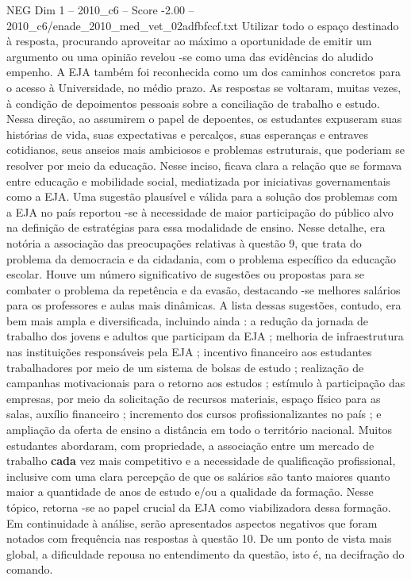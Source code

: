 \begin{textsample}{NEG Dim 1 – 2010\_c6 – Score -2.00 – 2010\_c6/enade\_2010\_med\_vet\_02adfbfccf.txt}
Utilizar todo o espaço destinado à resposta, procurando aproveitar ao máximo a oportunidade de emitir um argumento ou uma opinião revelou -se como uma das evidências do aludido empenho.
A EJA também foi reconhecida como um dos caminhos concretos para o acesso à Universidade, no médio prazo.
As respostas se voltaram, muitas vezes, à condição de depoimentos pessoais sobre a conciliação de trabalho e estudo.
Nessa direção, ao assumirem o papel de depoentes, os estudantes expuseram suas histórias de vida, suas expectativas e percalços, suas esperanças e entraves cotidianos, seus anseios mais ambiciosos e problemas estruturais, que poderiam se resolver por meio da educação.
Nesse inciso, ficava clara a relação que se formava entre educação e mobilidade social, mediatizada por iniciativas governamentais como a EJA.
Uma sugestão plausível e válida para a solução dos problemas com a EJA no país reportou -se à necessidade de maior participação do público alvo na definição de estratégias para essa modalidade de ensino.
Nesse detalhe, era notória a associação das preocupações relativas à questão 9, que trata do problema da democracia e da cidadania, com o problema específico da educação escolar.
Houve um número significativo de sugestões ou propostas para se combater o problema da repetência e da evasão, destacando -se melhores salários para os professores e aulas mais dinâmicas.
A lista dessas sugestões, contudo, era bem mais ampla e diversificada, incluindo ainda : a redução da jornada de trabalho dos jovens e adultos que participam da EJA ; melhoria de infraestrutura nas instituições responsáveis pela EJA ; incentivo financeiro aos estudantes trabalhadores por meio de um sistema de bolsas de estudo ; realização de campanhas motivacionais para o retorno aos estudos ; estímulo à participação das empresas, por meio da solicitação de recursos materiais, espaço físico para as salas, auxílio financeiro ; incremento dos cursos profissionalizantes no país ; e ampliação da oferta de ensino a distância em todo o território nacional.
Muitos estudantes abordaram, com propriedade, a associação entre um mercado de trabalho \textbf{cada} vez mais competitivo e a necessidade de qualificação profissional, inclusive com uma clara percepção de que os salários são tanto maiores quanto maior a quantidade de anos de estudo e/ou a qualidade da formação.
Nesse tópico, retorna -se ao papel crucial da EJA como viabilizadora dessa formação.
Em continuidade à análise, serão apresentados aspectos negativos que foram notados com frequência nas respostas à questão 10.
De um ponto de vista mais global, a dificuldade repousa no entendimento da questão, isto é, na decifração do comando.

\end{textsample}
